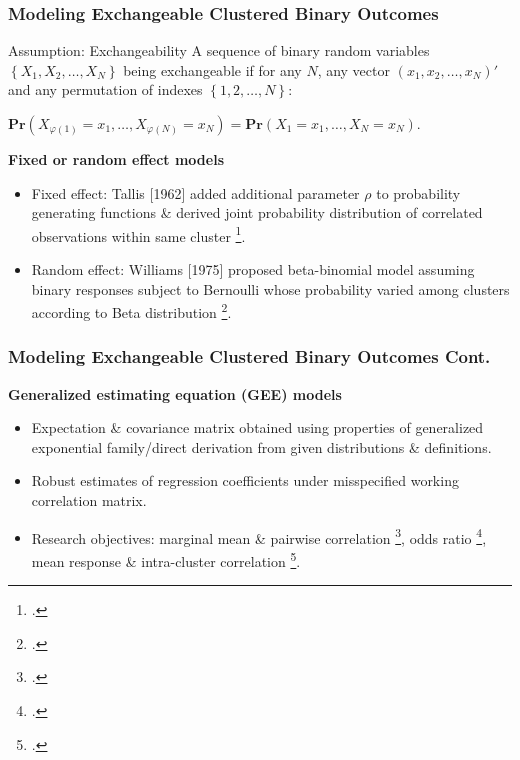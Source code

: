 \documentclass[hyperref={bookmarks=false},aspectratio=169]{beamer}
\begin{document}
\begin{frame}
\frametitle{Modeling Exchangeable Clustered Binary Outcomes}

\begin{block}{Assumption: Exchangeability}
A sequence of binary random variables $\left\lbrace X_1, X_2, \dots, X_N \right \rbrace$ being exchangeable if for any $N$, any vector $(x_1, x_2, \dots, x_N)'$ and any permutation of indexes $\left\lbrace 1, 2, \dots, N \right\rbrace$:

$\textbf{Pr}(X_{\varphi(1)} = x_1, \dots, X_{\varphi(N)} = x_N) = \textbf{Pr}(X_1=x_1, \dots, X_N=x_N)$.
\end{block}

\textbf{Fixed or random effect models}

\begin{itemize}
    \item Fixed effect: Tallis [1962] added additional parameter $\rho$ to probability generating functions {\&} derived joint probability distribution of correlated observations within same cluster \footcite{tallis1962use}.
    \item Random effect: Williams [1975] proposed beta-binomial model assuming binary responses subject to Bernoulli whose probability varied among clusters according to Beta distribution \footcite{WilliamsDA1975}.
\end{itemize}

\end{frame}

\begin{frame}
\frametitle{Modeling Exchangeable Clustered Binary Outcomes Cont.}

\textbf{Generalized estimating equation (GEE) models}

\begin{itemize}
    \item Expectation {\&} covariance matrix obtained using properties of generalized exponential family/direct derivation from given distributions {\&} definitions.
    \item Robust estimates of regression coefficients under misspecified working correlation matrix.
    \item Research objectives: marginal mean {\&} pairwise correlation \footcite{PrenticeZhao1991}, odds ratio \footcite{lipsitz1991generalized}, mean response {\&} intra-cluster correlation \footcite{BowmanChen1995}.
\end{itemize}

\end{frame}
\end{document}
